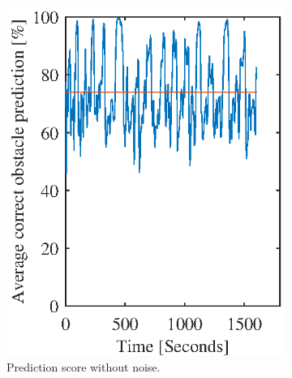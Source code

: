 \begin{figure}[htbp]
    \centering
    \begin{subfigure}[t]{0.49\textwidth}
        \includegraphics[width=1.0\textwidth]{chapters/mapping_of_dynamic_areas/figures/fremen_avg_miss_no_noise}	
        \caption{Prediction score without noise.}
        \label{fig:fremen_avg_miss_no_noise}
    \end{subfigure}
    \begin{subfigure}[t]{0.49\textwidth}

\end{subfigure}
\end{figure}
